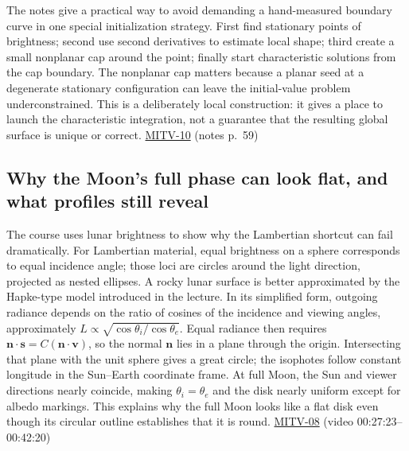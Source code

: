 The notes give a practical way to avoid demanding a hand-measured boundary curve in one special initialization strategy. First find stationary points of brightness; second use second derivatives to estimate local shape; third create a small nonplanar cap around the point; finally start characteristic solutions from the cap boundary. The nonplanar cap matters because a planar seed at a degenerate stationary configuration can leave the initial-value problem underconstrained. This is a deliberately local construction: it gives a place to launch the characteristic integration, not a guarantee that the resulting global surface is unique or correct. \hyperref[04-visual-computing-ii-ch036-mitv-10---characteristic-strip-expansion-shape-from-shading-iterative-solutions]{MITV-10} (notes p.~59)

\subsection{Why the Moon's full phase can look flat, and what profiles still reveal}\label{04-visual-computing-ii-ch032-why-the-moons-full-phase-can-look-flat-and-what-profiles-still-reveal}

The course uses lunar brightness to show why the Lambertian shortcut can fail dramatically. For Lambertian material, equal brightness on a sphere corresponds to equal incidence angle; those loci are circles around the light direction, projected as nested ellipses. A rocky lunar surface is better approximated by the Hapke-type model introduced in the lecture. In its simplified form, outgoing radiance depends on the ratio of cosines of the incidence and viewing angles, approximately \(L\propto\sqrt{\cos\theta_i/\cos\theta_e}\). Equal radiance then requires \(\mathbf n\cdot\mathbf s=C(\mathbf n\cdot\mathbf v)\), so the normal \(\mathbf n\) lies in a plane through the origin. Intersecting that plane with the unit sphere gives a great circle; the isophotes follow constant longitude in the Sun--Earth coordinate frame. At full Moon, the Sun and viewer directions nearly coincide, making \(\theta_i=\theta_e\) and the disk nearly uniform except for albedo markings. This explains why the full Moon looks like a flat disk even though its circular outline establishes that it is round. \hyperref[04-visual-computing-ii-ch036-mitv-08---shading-special-cases-lunar-surface-scanning-electron-microscope-greens-theorem]{MITV-08} (video 00:27:23--00:42:20)

